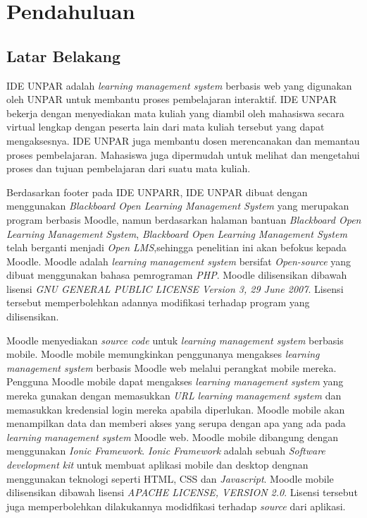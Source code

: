 \chapter{Pendahuluan}
\label{chap:intro}
   
\section{Latar Belakang}
\label{sec:label}

IDE UNPAR adalah \textit{learning management system} berbasis web yang digunakan oleh UNPAR untuk membantu proses pembelajaran interaktif. IDE UNPAR bekerja dengan menyediakan mata kuliah yang diambil oleh mahasiswa secara virtual lengkap dengan peserta lain dari mata kuliah tersebut yang dapat mengaksesnya. IDE UNPAR juga membantu dosen merencanakan dan memantau proses pembelajaran. Mahasiswa juga dipermudah untuk melihat dan mengetahui proses dan tujuan pembelajaran dari suatu mata kuliah. 

Berdasarkan footer pada IDE UNPARR, IDE UNPAR dibuat dengan menggunakan \textit{Blackboard Open Learning Management System}\cite{IDEUNPAR} yang merupakan program berbasis Moodle, namun berdasarkan halaman bantuan \textit{Blackboard Open Learning Management System}, \textit{Blackboard Open Learning Management System} telah berganti menjadi \textit{Open LMS}\cite{Blackboard},sehingga penelitian ini akan befokus kepada Moodle. Moodle adalah \textit{learning management system} bersifat \textit{Open-source} yang dibuat menggunakan bahasa pemrograman \textit{PHP}. Moodle dilisensikan dibawah lisensi \textit{GNU GENERAL PUBLIC LICENSE Version 3, 29 June 2007}. Lisensi tersebut memperbolehkan adannya modifikasi terhadap program yang dilisensikan.

Moodle menyediakan \textit{source code} untuk \textit{learning management system} berbasis mobile. Moodle mobile memungkinkan penggunanya mengakses \textit{learning management system} berbasis Moodle web melalui perangkat mobile mereka. Pengguna Moodle mobile dapat mengakses \textit{learning management system} yang mereka gunakan dengan memasukkan \textit{URL} \textit{learning management system} dan memasukkan kredensial login mereka apabila diperlukan. Moodle mobile akan menampilkan data dan memberi akses yang serupa dengan apa yang ada pada \textit{learning management system} Moodle web. Moodle mobile dibangung dengan menggunakan \textit{Ionic Framework}. \textit{Ionic Framework} adalah sebuah \textit{Software development kit} untuk membuat aplikasi mobile dan desktop dengnan menggunakan teknologi seperti HTML, CSS dan \textit{Javascript}\cite{Ionic:intro}. Moodle mobile dilisensikan dibawah lisensi   \textit{APACHE LICENSE, VERSION 2.0}. Lisensi tersebut juga memperbolehkan dilakukannya modidfikasi terhadap \textit{source} dari aplikasi.



